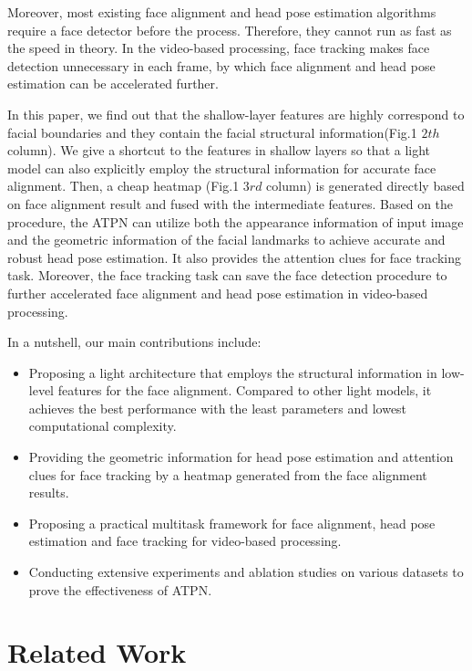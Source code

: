 \documentclass[3p,twocolumn, round, sort & compress]{elsarticle}
\begin{document}
Moreover, most existing face alignment and head pose estimation algorithms require a face detector before the process. Therefore, they cannot run as fast as the speed in theory. In the video-based processing, face tracking makes face detection unnecessary in each frame, by which face alignment and head pose estimation can be accelerated further.

In this paper, we find out that the shallow-layer features are highly correspond to facial boundaries and they contain the facial structural information(Fig.1 $2th$ column). We give a shortcut to the features in shallow layers so that a light model can also explicitly employ the structural information for accurate face alignment. Then, a cheap heatmap (Fig.1 $3rd$ column) is generated directly based on face alignment result and fused with the intermediate features. Based on the procedure, the ATPN can utilize both the appearance information of input image and the geometric information of the facial landmarks to achieve accurate and robust head pose estimation. It also provides the attention clues for face tracking task. Moreover, the face tracking task can save the face detection procedure to further accelerated face alignment and head pose estimation in video-based processing. 


In a nutshell, our main contributions include:
\begin{itemize} 
	\item Proposing a light architecture that employs the structural information in low-level features for the face alignment. Compared to other light models, it achieves the best performance with the least parameters and lowest computational complexity.
	\item Providing the geometric information for head pose estimation and attention clues for face tracking by a heatmap generated from the face alignment results. 
	\item Proposing a practical multitask framework for face alignment, head pose estimation and face tracking for video-based processing.
	\item Conducting extensive experiments and ablation studies on various datasets to prove the effectiveness of ATPN.
\end{itemize}

\section{Related Work}
\end{document}
